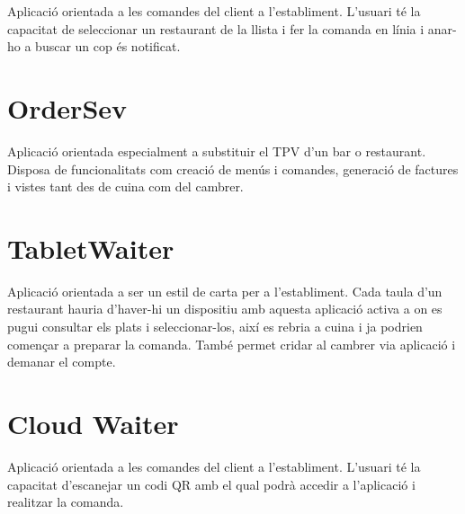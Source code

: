 Aplicació\cite{primetray} orientada a les comandes del client a l'establiment. L'usuari té la capacitat de seleccionar un restaurant de la llista i fer la comanda en línia i anar-ho a buscar un cop és notificat.


\section{OrderSev}

Aplicació\cite{ordersev} orientada especialment a substituir el TPV d'un bar o restaurant. Disposa de funcionalitats com creació de menús i comandes, generació de factures i vistes tant des de cuina com del cambrer.


\section{TabletWaiter}

Aplicació\cite{tabletwaiter} orientada a ser un estil de carta per a l'establiment. Cada taula d'un restaurant hauria d'haver-hi un dispositiu amb aquesta aplicació activa a on es pugui consultar els plats i seleccionar-los, així es rebria a cuina i ja podrien començar a preparar la comanda. També permet cridar al cambrer via aplicació i demanar el compte.


\section{Cloud Waiter}

Aplicació\cite{cloudwaiter} orientada a les comandes del client a l'establiment. L'usuari té la capacitat d'escanejar un codi QR amb el qual podrà accedir a l'aplicació i realitzar la comanda.


